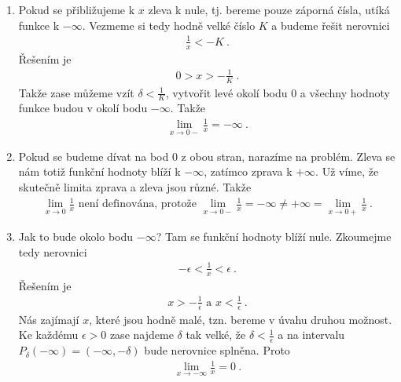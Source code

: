 \begin{example}
\begin{enumerate}[label=(\roman*)]
        \item Pokud se přibližujeme k $x$ zleva k nule, tj. bereme pouze záporná čísla, utíká funkce k $-\infty$. Vezmeme si tedy hodně velké číslo $K$ a budeme řešit nerovnici
        \begin{align}
            \frac{1}{x} < - K \:.
        \end{align}
        Řešením je
        \begin{align}
            0 > x > - \frac{1}{K} \:.
        \end{align}
        Takže zase můžeme vzít $\delta < \frac{1}{K}$, vytvořit levé okolí bodu $0$ a všechny hodnoty funkce budou v okolí bodu $-\infty$. Takže
        \begin{align}
            \lim_{x \rightarrow 0-} \frac{1}{x} = - \infty \:.
        \end{align}
    
        \item Pokud se budeme dívat na bod $0$ z obou stran, narazíme na problém. Zleva se nám totiž funkční hodnoty blíží k $-\infty$, zatímco zprava k $+\infty$. Už víme, že skutečně limita zprava a zleva jsou různé. Takže
        \begin{align}
            \lim_{x \rightarrow 0} \frac{1}{x} \text{ není definována, protože } \lim_{x \rightarrow 0-} \frac{1}{x} = - \infty \neq + \infty = \lim_{x \rightarrow 0+} \frac{1}{x} \:.
        \end{align}

        \item Jak to bude okolo bodu $-\infty$? Tam se funkční hodnoty blíží nule. Zkoumejme tedy nerovnici
        \begin{align}
            -\epsilon <\frac{1}{x} < \epsilon \:. 
        \end{align}
        Řešením je
        \begin{align}
            x > -\frac{1}{\epsilon} \text{ a } x < \frac{1}{\epsilon} \:.
        \end{align}
        Nás zajímají $x$, které jsou hodně malé, tzn. bereme v úvahu druhou možnost. Ke každému $\epsilon >0$ zase najdeme $\delta$ tak velké, že $\delta < \frac{1}{\epsilon}$ a na intervalu $P_\delta(-\infty) = (-\infty, -\delta)$ bude nerovnice splněna. Proto
        \begin{align}
            \lim_{x \rightarrow -\infty} \frac{1}{x} = 0 \:.
        \end{align}
    \end{enumerate}
\end{example}

